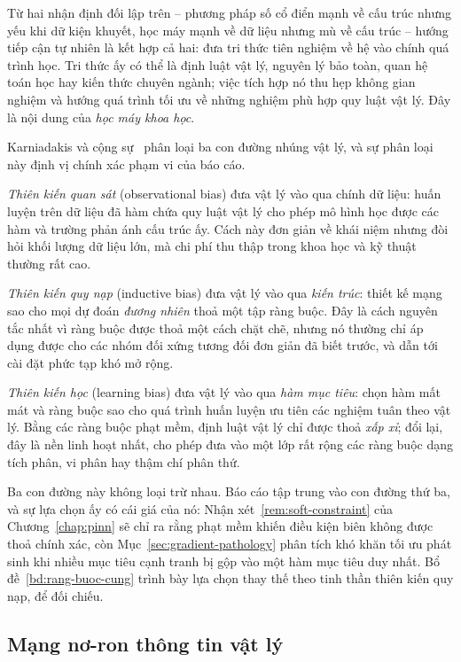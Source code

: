 Từ hai nhận định đối lập trên -- phương pháp số cổ điển mạnh về cấu trúc nhưng
yếu khi dữ kiện khuyết, học máy mạnh về dữ liệu nhưng mù về cấu trúc -- hướng
tiếp cận tự nhiên là kết hợp cả hai: đưa tri thức tiên nghiệm về hệ vào chính quá
trình học. Tri thức ấy có thể là định luật vật lý, nguyên lý bảo toàn, quan hệ
toán học hay kiến thức chuyên ngành; việc tích hợp nó thu hẹp không gian nghiệm
và hướng quá trình tối ưu về những nghiệm phù hợp quy luật vật lý. Đây là nội
dung của \emph{học máy khoa học}.
 
Karniadakis và cộng sự~\cite{karniadakis2021} phân loại ba con đường nhúng vật lý,
và sự phân loại này định vị chính xác phạm vi của báo cáo.
 
\emph{Thiên kiến quan sát} (observational bias) đưa vật lý vào qua chính dữ liệu:
huấn luyện trên dữ liệu đã hàm chứa quy luật vật lý cho phép mô hình học được các
hàm và trường phản ánh cấu trúc ấy. Cách này đơn giản về khái niệm nhưng đòi hỏi
khối lượng dữ liệu lớn, mà chi phí thu thập trong khoa học và kỹ thuật thường rất
cao.
 
\emph{Thiên kiến quy nạp} (inductive bias) đưa vật lý vào qua \emph{kiến trúc}:
thiết kế mạng sao cho mọi dự đoán \emph{đương nhiên} thoả một tập ràng buộc. Đây
là cách nguyên tắc nhất vì ràng buộc được thoả một cách chặt chẽ, nhưng nó thường
chỉ áp dụng được cho các nhóm đối xứng tương đối đơn giản đã biết trước, và dẫn
tới cài đặt phức tạp khó mở rộng.
 
\emph{Thiên kiến học} (learning bias) đưa vật lý vào qua \emph{hàm mục tiêu}: chọn
hàm mất mát và ràng buộc sao cho quá trình huấn luyện ưu tiên các nghiệm tuân theo
vật lý. Bằng các ràng buộc phạt mềm, định luật vật lý chỉ được thoả \emph{xấp
xỉ}; đổi lại, đây là nền linh hoạt nhất, cho phép đưa vào một lớp rất rộng các
ràng buộc dạng tích phân, vi phân hay thậm chí phân thứ.
 
Ba con đường này không loại trừ nhau. Báo cáo tập trung vào con đường thứ ba, và
sự lựa chọn ấy có cái giá của nó: Nhận xét~\ref{rem:soft-constraint} của
Chương~\ref{chap:pinn} sẽ chỉ ra rằng phạt mềm khiến điều kiện biên không được
thoả chính xác, còn Mục~\ref{sec:gradient-pathology} phân tích khó khăn tối ưu
phát sinh khi nhiều mục tiêu cạnh tranh bị gộp vào một hàm mục tiêu duy nhất.
Bổ đề~\ref{bd:rang-buoc-cung} trình bày lựa chọn thay thế theo tinh thần thiên
kiến quy nạp, để đối chiếu.
 
\subsection{Mạng nơ-ron thông tin vật lý}
 
